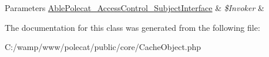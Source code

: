 \begin{DoxyParams}[1]{Parameters}
\hyperlink{interface_able_polecat___access_control___subject_interface}{Able\+Polecat\+\_\+\+Access\+Control\+\_\+\+Subject\+Interface} & {\em \$\+Invoker} & \\
\hline
\end{DoxyParams}


The documentation for this class was generated from the following file\+:\begin{DoxyCompactItemize}
\item 
C\+:/wamp/www/polecat/public/core/Cache\+Object.\+php\end{DoxyCompactItemize}
